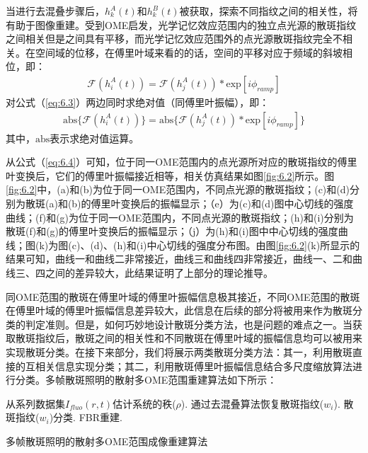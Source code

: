 当进行去混叠步骤后，$h_{k}^{A}(t)$和$h_{k}^{B}(t)$被获取，探索不同指纹之间的相关性，将有助于图像重建。受到OME启发，光学记忆效应范围内的独立点光源的散斑指纹之间相关但是之间具有平移\cite{Freund1988}，而光学记忆效应范围外的点光源散斑指纹完全不相关。在空间域的位移，在傅里叶域来看的的话，空间的平移对应于频域的斜坡相位，即：
\begin{equation}
\begin{aligned}
\mathcal{F}(h_i^{A}(t)) = \mathcal{F}(h_j^{A}(t))*\mbox{exp}[i\phi_{ramp}]
\label{eq:6.3}
\end{aligned}
\end{equation} 对公式（\ref{eq:6.3}）两边同时求绝对值（同傅里叶振幅），即：
\begin{equation}
\begin{aligned}
\mbox{abs} \{ \mathcal{F}(h_i^{A}(t)) \} = \mbox{abs} \{  \mathcal{F}(h_j^{A}(t))*\mbox{exp}[i\phi_{ramp}] \}
\label{eq:6.4}
\end{aligned}
\end{equation}其中，$\mbox{abs}$表示求绝对值运算。

从公式（\ref{eq:6.4}）可知，位于同一OME范围内的点光源所对应的散斑指纹的傅里叶变换后，它们的傅里叶振幅接近相等，相关仿真结果如图\ref{fig:6.2}所示。图\ref{fig:6.2}中，(a)和(b)为位于同一OME范围内，不同点光源的散斑指纹；(c)和(d)分别为散斑(a)和(b)的傅里叶变换后的振幅显示；（e）为(c)和(d)图中心切线的强度曲线；(f)和(g)为位于同一OME范围内，不同点光源的散斑指纹；(h)和(i)分别为散斑(f)和(g)的傅里叶变换后的振幅显示；（j）为(h)和(i)图中中心切线的强度曲线；图(k)为图(c)、(d)、(h)和(i)中心切线的强度分布图。由图\ref{fig:6.2}(k)所显示的结果可知，曲线一和曲线二非常接近，曲线三和曲线四非常接近，曲线一、二和曲线三、四之间的差异较大，此结果证明了上部分的理论推导。

同OME范围的散斑在傅里叶域的傅里叶振幅信息极其接近，不同OME范围的散斑在傅里叶域的傅里叶振幅信息差异较大，此信息在后续的部分将被用来作为散斑分类的判定准则。但是，如何巧妙地设计散斑分类方法，也是问题的难点之一。当获取散斑指纹后，散斑之间的相关性和不同散斑在傅里叶域的振幅信息均可以被用来实现散斑分类。在接下来部分，我们将展示两类散斑分类方法：其一，利用散斑直接的互相关信息实现分类；其二，利用散斑傅里叶振幅信息结合多尺度缩放算法进行分类。多帧散斑照明的散射多OME范围重建算法如下所示：

\begin{algorithm2e}[htp]
\DontPrintSemicolon
\SetAlgoLined
{}
从系列数据集$I_{fluo}(r,t)$估计系统的秩($\rho$).\;
通过去混叠算法恢复散斑指纹($w_{i}$).\;
散斑指纹($w_{i}$)分类.\;
FBR重建.\;
\caption{多帧散斑照明的散射多OME范围成像重建算法}
\label{alg:a2}
\end{algorithm2e}

